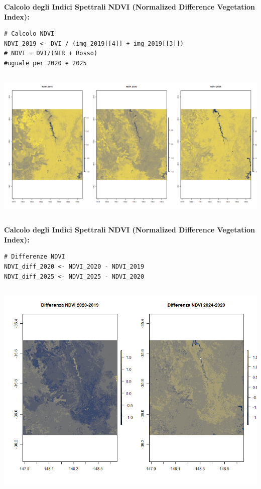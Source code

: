 \documentclass{beamer}
\begin{document}
\begin{frame}[fragile]{\textbf{Calcolo degli Indici Spettrali}}
\textbf{NDVI (Normalized Difference Vegetation Index):}
\begin{lstlisting}
# Calcolo NDVI
NDVI_2019 <- DVI / (img_2019[[4]] + img_2019[[3]])
# NDVI = DVI/(NIR + Rosso)
#uguale per 2020 e 2025
\end{lstlisting}
\begin{columns}
    \centering
    \includegraphics[width=\textwidth]{NDVI.png}
\end{columns}
\end{frame}

\begin{frame}[fragile]{\textbf{Calcolo degli Indici Spettrali}}
\textbf{NDVI (Normalized Difference Vegetation Index):}
\begin{lstlisting}
# Differenze NDVI
NDVI_diff_2020 <- NDVI_2020 - NDVI_2019 
NDVI_diff_2025 <- NDVI_2025 - NDVI_2020 
\end{lstlisting}
\begin{columns}
    \centering
    \includegraphics[width=\textwidth]{NDVI_diff.png}
\end{columns}
\end{frame}
\end{document}
